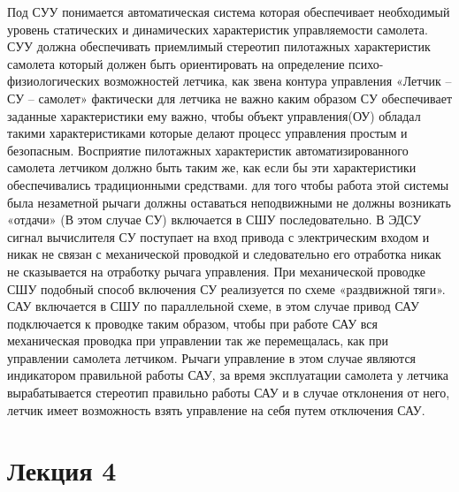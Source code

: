 \documentclass{article}
\begin{document}
Под СУУ понимается автоматическая система которая обеспечивает необходимый уровень статических и динамических характеристик управляемости самолета. СУУ должна обеспечивать приемлимый стереотип пилотажных характеристик самолета который должен быть ориентировать на определение психо-физиологических возможностей летчика, как звена контура управления «Летчик -- СУ -- самолет» фактически для летчика не важно каким образом СУ обеспечивает заданные характеристики ему важно, чтобы объект управления(ОУ) обладал такими характеристиками которые делают процесс управления простым и безопасным. Восприятие пилотажных характеристик автоматизированного самолета летчиком должно быть таким же, как если бы эти характеристики обеспечивались традиционными средствами. для того чтобы работа этой системы была незаметной рычаги должны оставаться неподвижными не должны возникать «отдачи» (В этом случае СУ) включается в СШУ последовательно. В ЭДСУ сигнал вычислителя СУ поступает на вход привода с электрическим входом и никак не связан с механической проводкой и следовательно его отработка никак не сказывается на отработку рычага управления. При механической проводке СШУ подобный способ включения СУ реализуется по схеме «раздвижной тяги».
САУ включается в СШУ по параллельной схеме, в этом случае привод САУ подключается к проводке таким образом, чтобы при работе САУ вся механическая проводка при управлении так же перемещалась, как при управлении самолета летчиком. Рычаги управление в этом случае являются индикатором правильной работы САУ, за время эксплуатации самолета у летчика вырабатывается стереотип правильно работы САУ и в случае отклонения от него, летчик имеет возможность взять управление на себя путем отключения САУ.
\newpage
\section{Лекция 4}
\end{document}
